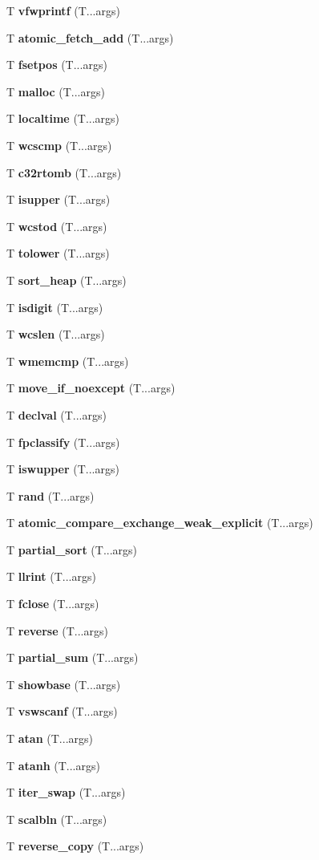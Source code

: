 \begin{DoxyCompactItemize}
\item 
T {\bf vfwprintf} (T...\+args)
\item 
T {\bf atomic\+\_\+fetch\+\_\+add} (T...\+args)
\item 
T {\bf fsetpos} (T...\+args)
\item 
T {\bf malloc} (T...\+args)
\item 
T {\bf localtime} (T...\+args)
\item 
T {\bf wcscmp} (T...\+args)
\item 
T {\bf c32rtomb} (T...\+args)
\item 
T {\bf isupper} (T...\+args)
\item 
T {\bf wcstod} (T...\+args)
\item 
T {\bf tolower} (T...\+args)
\item 
T {\bf sort\+\_\+heap} (T...\+args)
\item 
T {\bf isdigit} (T...\+args)
\item 
T {\bf wcslen} (T...\+args)
\item 
T {\bf wmemcmp} (T...\+args)
\item 
T {\bf move\+\_\+if\+\_\+noexcept} (T...\+args)
\item 
T {\bf declval} (T...\+args)
\item 
T {\bf fpclassify} (T...\+args)
\item 
T {\bf iswupper} (T...\+args)
\item 
T {\bf rand} (T...\+args)
\item 
T {\bf atomic\+\_\+compare\+\_\+exchange\+\_\+weak\+\_\+explicit} (T...\+args)
\item 
T {\bf partial\+\_\+sort} (T...\+args)
\item 
T {\bf llrint} (T...\+args)
\item 
T {\bf fclose} (T...\+args)
\item 
T {\bf reverse} (T...\+args)
\item 
T {\bf partial\+\_\+sum} (T...\+args)
\item 
T {\bf showbase} (T...\+args)
\item 
T {\bf vswscanf} (T...\+args)
\item 
T {\bf atan} (T...\+args)
\item 
T {\bf atanh} (T...\+args)
\item 
T {\bf iter\+\_\+swap} (T...\+args)
\item 
T {\bf scalbln} (T...\+args)
\item 
T {\bf reverse\+\_\+copy} (T...\+args)
\item 

\end{DoxyCompactItemize}
